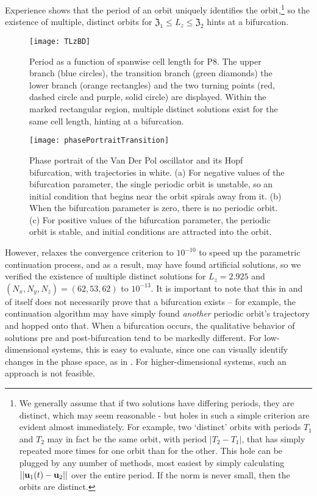 Experience shows that the period of an orbit uniquely identifies the orbit,\footnote{We generally assume that if two solutions have differing periods, they are distinct, which may seem reasonable - but holes in such a simple criterion are evident almost immediately. For example, two `distinct' orbits with periods $T_1$ and $T_2$ may in fact be the same orbit, with period $|T_2-T_1|$, that has simply repeated more times for one orbit than for the other. This hole can be plugged by any number of methods, most easiest by simply calculating $||\mathbf{u}_1(t) - \mathbf{u}_2||$ over the entire period. If the norm is never small, then the orbits are distinct. } so  the existence of multiple, distinct orbits for $\mathfrak{Z}_1 \leq L_z \leq \mathfrak{Z}_2$ hints at a bifurcation.
\begin{figure}[t]
\texttt{[image: TLzBD]}
\caption{Period as a function of spanwise cell length for P8. The {upper branch} (blue circles), the {transition branch} (green diamonds) the { lower branch} (orange rectangles) and the two turning points (red, dashed circle and purple, solid circle) are displayed. Within the marked rectangular region, multiple distinct solutions exist for the same cell length, hinting at a bifurcation.}\label{fig:LZBif}
\end{figure}
\begin{figure}[t]
\texttt{[image: phasePortraitTransition]}
\caption{Phase portrait of the Van Der Pol oscillator and its Hopf bifurcation, with trajectories in white. (a) For negative values of the bifurcation parameter, the single periodic orbit is unstable, so an initial condition that begins near the orbit spirals away from it. (b) When the bifurcation parameter is zero, there is no periodic orbit. (c) For positive values of the bifurcation parameter, the periodic orbit is stable, and initial conditions are attracted into the orbit.}\label{fig:phasePortrait}
\end{figure}
However,  relaxes the convergence criterion to $10^{-10}$ to speed up the parametric continuation process, and as a result, may have found artificial solutions, so we verified the existence of multiple distinct solutions for $L_z = 2.925$ and $(N_x,N_y,N_z) = (62,53,62)$ to $10^{-13}$. It is important to note that this in and of itself does not necessarily prove that a bifurcation exists -- for example, the continuation algorithm may have simply found \emph{another} periodic orbit's trajectory and hopped onto that. When a bifurcation occurs, the qualitative behavior of solutions pre and post-bifurcation tend to be markedly different. For low-dimensional systems, this is easy to evaluate, since one can visually identify changes in the phase space, as in . For higher-dimensional systems, such an approach is not feasible. 

